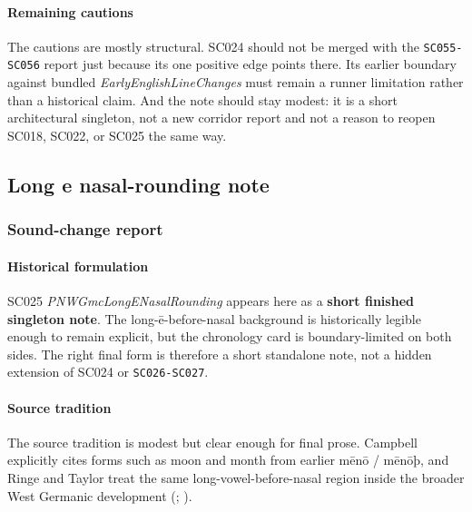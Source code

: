 \documentclass[
  british,
  a4paper,
]{article}
\begin{document}
\paragraph{Remaining cautions}\label{remaining-cautions-17}

The cautions are mostly structural. SC024 should not be merged with the
\texttt{SC055-SC056} report just because its one positive edge points
there. Its earlier boundary against bundled
\emph{EarlyEnglishLineChanges} must remain a runner limitation rather
than a historical claim. And the note should stay modest: it is a short
architectural singleton, not a new corridor report and not a reason to
reopen SC018, SC022, or SC025 the same way.

\subsection{Long e nasal-rounding
note}\label{long-e-nasal-rounding-note}

\subsubsection{Sound-change report}\label{sound-change-report-18}

\paragraph{Historical formulation}\label{historical-formulation-18}

SC025 \emph{PNWGmcLongENasalRounding} appears here as a \textbf{short
finished singleton note}. The long-ē-before-nasal background is
historically legible enough to remain explicit, but the chronology card
is boundary-limited on both sides. The right final form is therefore a
short standalone note, not a hidden extension of SC024 or
\texttt{SC026-SC027}.

\paragraph{Source tradition}\label{source-tradition-18}

The source tradition is modest but clear enough for final prose.
Campbell explicitly cites forms such as moon and month from earlier mēnō
/ mēnōþ, and Ringe and Taylor treat the same long-vowel-before-nasal
region inside the broader West Germanic development
(;
).
\end{document}
